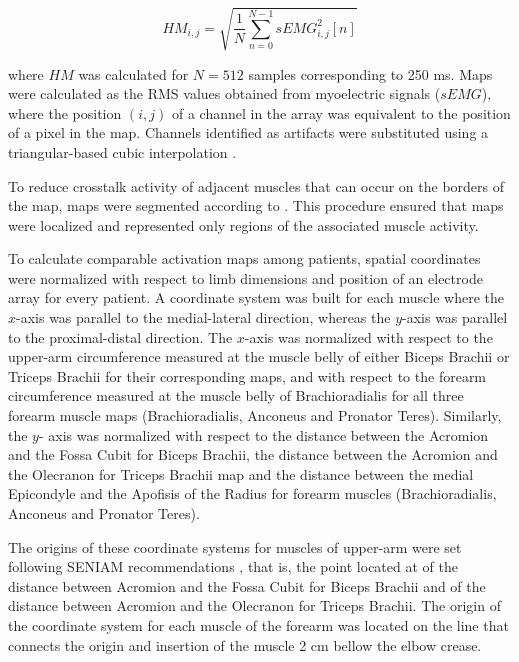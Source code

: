 \begin{equation} \label{eq:2-1}
HM_{i,j} = \sqrt{\frac{1}{N} \sum_{n=0}^{N-1} sEMG_{i,j}^{2}[n] }
\end{equation}

where $HM$ was calculated for $N=512$ samples corresponding to 250 ms. Maps were calculated as the RMS values obtained from myoelectric signals ($sEMG$), where the position $(i,j)$ of a channel in the array was equivalent to the position of a pixel in the map. Channels identified as artifacts were substituted using a triangular-based cubic interpolation \citep{Rojas-Martinez2012}.

To reduce crosstalk activity of adjacent muscles that can occur on the borders of the map, maps were segmented according to \citep{Rojas-Martinez2012}. This procedure ensured that maps were localized and represented only regions of the associated muscle activity.

To calculate comparable activation maps among patients, spatial coordinates were normalized with respect to limb dimensions and position of an electrode array for every patient. A coordinate system was built for each muscle where the $x$-axis was parallel to the medial-lateral direction, whereas the $y$-axis was parallel to the proximal-distal direction. The $x$-axis was normalized with respect to the upper-arm circumference measured at the muscle belly of either Biceps Brachii or Triceps Brachii for their corresponding maps, and with respect to the forearm circumference measured at the muscle belly of Brachioradialis for all three forearm muscle maps (Brachioradialis, Anconeus and Pronator Teres). Similarly, the $y$- axis was normalized with respect to the distance between the Acromion and the Fossa Cubit for Biceps Brachii, the distance between the Acromion and the Olecranon for Triceps Brachii map and the distance between the medial Epicondyle and the Apofisis of the Radius for forearm muscles (Brachioradialis, Anconeus and Pronator Teres).

The origins of these coordinate systems for muscles of upper-arm were set following SENIAM recommendations \citep{Hermens1999}, that is, the point located at  of the distance between Acromion and the Fossa Cubit for Biceps Brachii and  of the distance between Acromion and the Olecranon for Triceps Brachii. The origin of the coordinate system for each muscle of the forearm was located on the line that connects the origin and insertion of the muscle \citep{Kendall1993} 2 cm bellow the elbow crease.

